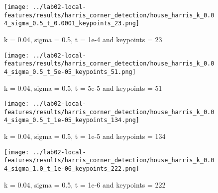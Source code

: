 \documentclass{ETHExercise}
\begin{document}
\begin{figure}[!h]
    \texttt{[image: ../lab02-local-features/results/harris\_corner\_detection/house\_harris\_k\_0.04\_sigma\_0.5\_t\_0.0001\_keypoints\_23.png]}
    \caption{k = 0.04, sigma = 0.5, t = 1e-4 and keypoints = 23}
  \endminipage\hfill
    \texttt{[image: ../lab02-local-features/results/harris\_corner\_detection/house\_harris\_k\_0.04\_sigma\_0.5\_t\_5e-05\_keypoints\_51.png]}
    \caption{k = 0.04, sigma = 0.5, t = 5e-5 and keypoints = 51}
  \endminipage\hfill
    \texttt{[image: ../lab02-local-features/results/harris\_corner\_detection/house\_harris\_k\_0.04\_sigma\_0.5\_t\_1e-05\_keypoints\_134.png]}
    \caption{k = 0.04, sigma = 0.5, t = 1e-5 and keypoints = 134}
  \endminipage\hfill
    \texttt{[image: ../lab02-local-features/results/harris\_corner\_detection/house\_harris\_k\_0.04\_sigma\_1.0\_t\_1e-06\_keypoints\_222.png]}
    \caption{k = 0.04, sigma = 0.5, t = 1e-6 and keypoints = 222}
  \endminipage
\end{figure}
\end{document}
